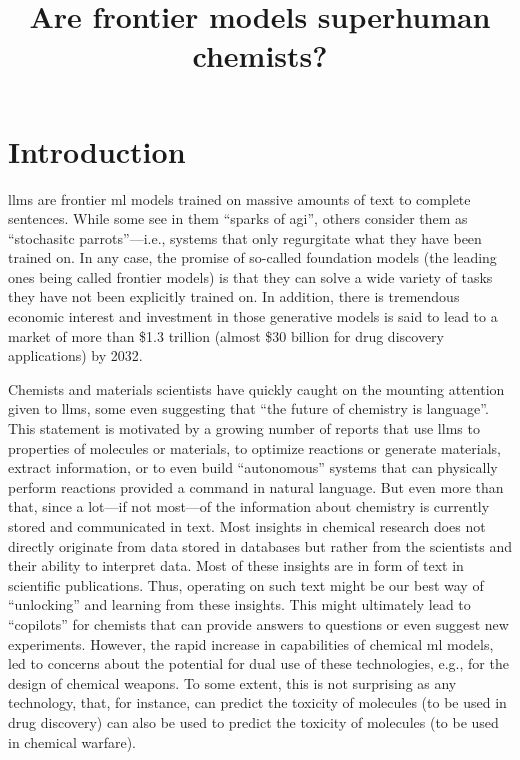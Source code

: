 \documentclass[11pt, oneside]{article}
\title{\textsf{Are frontier models superhuman chemists?}}
\begin{document}
\maketitle

\begin{abstract}
\end{abstract}

\clearpage

\section{Introduction}
\Glspl{llm} are frontier \gls{ml} models trained on massive amounts of text to complete sentences.
While some see in them \enquote{sparks of \gls{agi}},\cite{bubeck2023sparks} others consider them as \enquote{stochasitc parrots}---i.e., systems that only regurgitate what they have been trained on.\cite{bender2021dangers}
In any case, the promise of so-called foundation models (the leading ones being called frontier models) is that they can solve a wide variety of tasks they have not been explicitly trained on.\cite{bommasani2021opportunities, anderljung2023frontier}
In addition, there is tremendous economic interest and investment in those generative models is said to lead to a market of more than \$1.3 trillion (almost \$30 billion for drug discovery applications) by 2032.\cite{bloomberg}

Chemists and materials scientists have quickly caught on the mounting attention given to \glspl{llm}, some even suggesting that \enquote{the future of chemistry is language}.\cite{White_2023}
This statement is motivated by a growing number of reports that use \glspl{llm} to properties of molecules or materials,\cite{jablonka202314, jablonka2024leveraging, xie2024fine} to optimize reactions\cite{ramos2023bayesian, kristiadi2024sober} or generate materials,\cite{rubungo2023llm, flam2023language, gruver2024fine} extract information,\cite{Patiny_2023, Dagdelen_2024, Zheng_2024, lála2023paperqa, caufield2023structured} or to even build \enquote{autonomous} systems that can physically perform reactions provided a command in natural language.\cite{bran2023chemcrow, Boiko_2023, darvish2024organa}
But even more than that, since a lot---if not most---of the information about chemistry is currently stored and communicated in text. 
Most insights in chemical research does not directly originate from data stored in databases but rather from the scientists and their ability to interpret data. 
Most of these insights are in form of text in scientific publications. 
Thus, operating on such text might be our best way of \enquote{unlocking} and learning from these insights.
This might ultimately lead to \enquote{copilots} for chemists that can provide answers to questions or even suggest new experiments.
However, the rapid increase in capabilities of chemical \gls{ml} models, led to concerns about the potential for dual use of these technologies, e.g., for the design of chemical weapons.\cite{gopal2023releasing, ganguli2022red, Urbina_2022}
To some extent, this is not surprising as any technology, that, for instance, can predict the toxicity of molecules (to be used in drug discovery) can also be used to predict the toxicity of molecules (to be used in chemical warfare).
\end{document}
